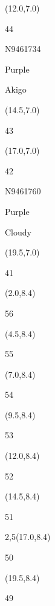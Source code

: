 \documentclass[a4paper]{article}
\newcommand{\myseat}[4]{%
\vspace{-0.1cm} \hspace{-0.5cm}
\parbox[t][2.2cm][t]{3.5cm}{%
\small #1 %
\begin{description}
\vspace{-0.1cm}
\item [ID:] #2
\vspace{-0.1cm}
\item [Team:] #3 \normalsize
\vspace{-0.1cm}
\item \normalsize #4
\vspace{-0.1cm}
\end{description}
}
}
\begin{document}
\begin{textblock}{2.5}(12.0,7.0)
\myseat{44}{N9461734}{Purple}{Akigo}
\end{textblock}

\begin{textblock}{2.5}(14.5,7.0)
\textblockcolor{}
\myseat{43}{}{}{}
\end{textblock}

\begin{textblock}{2.5}(17.0,7.0)
\myseat{42}{N9461760}{Purple}{Cloudy}
\end{textblock}

\begin{textblock}{2.5}(19.5,7.0)
\textblockcolor{}
\myseat{41}{}{}{}
\end{textblock}


\begin{textblock}{2.5}(2.0,8.4)
\textblockcolor{}
\myseat{56}{}{}{}
\end{textblock}

\begin{textblock}{2.5}(4.5,8.4)
\textblockcolor{}
\myseat{55}{}{}{}
\end{textblock}

\begin{textblock}{2.5}(7.0,8.4)
\textblockcolor{}
\myseat{54}{}{}{}
\end{textblock}

\begin{textblock}{2.5}(9.5,8.4)
\textblockcolor{}
\myseat{53}{}{}{}
\end{textblock}

\begin{textblock}{2.5}(12.0,8.4)
\textblockcolor{}
\myseat{52}{}{}{}
\end{textblock}

\begin{textblock}{2.5}(14.5,8.4)
\textblockcolor{}
\myseat{51}{}{}{}
\end{textblock}

\begin{textblock}{2,5}(17.0,8.4)
\textblockcolor{}
\myseat{50}{}{}{}
\end{textblock}

\begin{textblock}{2.5}(19.5,8.4)
\textblockcolor{}
\myseat{49}{}{}{}
\end{textblock}
\end{document}
